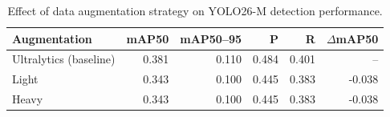 \begin{table}[htbp]
\centering
\caption{Effect of data augmentation strategy on YOLO26-M detection performance.}
\label{tab:ablation-augmentation}
\begin{tabular}{lrrrrr}
\toprule
Augmentation & mAP50 & mAP50--95 & P & R & $\Delta$mAP50 \\
\midrule
Ultralytics (baseline) & 0.381 & 0.110 & 0.484 & 0.401 & -- \\
Light & 0.343 & 0.100 & 0.445 & 0.383 & -0.038 \\
Heavy & 0.343 & 0.100 & 0.445 & 0.383 & -0.038 \\
\bottomrule
\end{tabular}
\end{table}